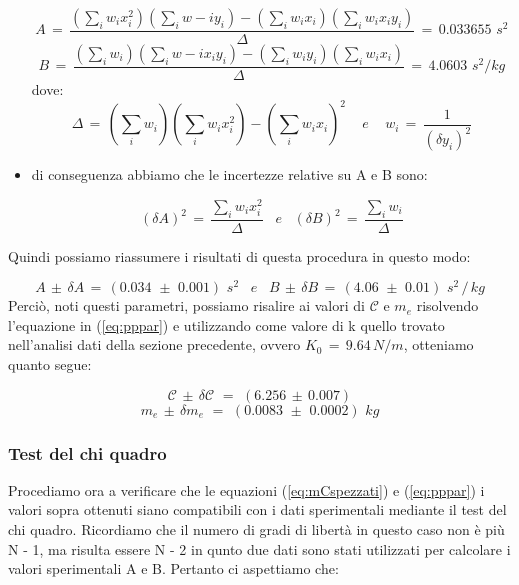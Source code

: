 \begin{itemize}
{		\begin{equation*}
			A \,=\, \frac{(\sum_i w_i x_i^2)(\sum_i w-i y_i) - (\sum_i w_i x_i)(\sum_i w_i x_i y_i)}{\Delta} \,=\, 0.033655 \,\, s^2
		\end{equation*}
		\begin{equation*}
			B \,=\, \frac{(\sum_i w_i)(\sum_i w-i x_i y_i) - (\sum_i w_i y_i)(\sum_i w_i x_i)}{\Delta} \,=\, 4.0603 \,\, s^2 / kg
		\end{equation*}
		dove:
		\begin{equation*}
			\Delta \,=\, (\sum_i w_i)(\sum_i w_i x_i^2) - (\sum_i w_i x_i)^2 \,\,\,\,\,\,\, e \,\,\,\,\,\,\,
			w_i \,=\, \frac{1}{(\delta y_i)^2}
		\end{equation*}}
\item{di conseguenza abbiamo che le incertezze relative su A e B sono:

		\begin{equation*}
			(\delta A)^2 \,=\, \frac{\sum_i w_i x_i^2}{\Delta}  \,\,\,\,\, e \,\,\,\,\,
			(\delta B)^2 \,=\, \frac{\sum_i w_i}{\Delta} 
		\end{equation*}}
\end{itemize} 
Quindi possiamo riassumere i risultati di questa procedura in questo modo:

\begin{equation*}
	A \,\pm\, \delta A \,=\, (0.034 \,\, \pm \,\, 0.001) \,\,s^2 \,\,\,\,\, e \,\,\,\,\,
	B \,\pm\, \delta B \,=\, (4.06 \,\, \pm \,\, 0.01) \,\,s^2 \,/\, kg
\end{equation*}
%
Perciò, noti questi parametri, possiamo risalire ai valori di $\mathcal{C}$ e $m_e$ risolvendo l'equazione in (\ref{eq:pppar}) e utilizzando come valore di k quello trovato nell'analisi dati della sezione precedente, ovvero $K_0 \,=\, 9.64 \, N/m$, otteniamo quanto segue:

\begin{equation*}
	\mathcal{C} \,\pm\, \delta \mathcal{C} \,\,=\,\, (6.256 \, \pm \, 0.007)
\end{equation*}
%
\begin{equation*}
	m_e \, \pm \, \delta m_e \,\,=\,\, (0.0083 \,\, \pm \,\, 0.0002) \,\, kg
\end{equation*}

\subsubsection{Test del chi quadro}
Procediamo ora a verificare che le equazioni (\ref{eq:mCspezzati}) e (\ref{eq:pppar}) i valori sopra ottenuti siano compatibili con i dati sperimentali mediante il test del chi quadro. Ricordiamo che il numero di gradi di libertà in questo caso non è più N - 1, ma risulta essere N - 2 in qunto due dati sono stati utilizzati per calcolare i  valori sperimentali A e B. Pertanto ci aspettiamo che:

